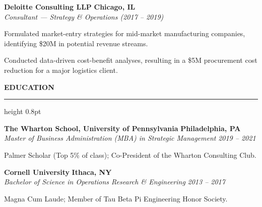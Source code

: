 \documentclass[10pt,letterpaper]{article}
\newcommand{\cvsection}[1]{%
  \vspace{9pt}%
  {\large\bfseries\color{accent}\MakeUppercase{#1}}%
  \vspace{3pt}%
  {\color{bordergray}\hrule height 0.8pt}%
  \vspace{5pt}%
}
\begin{document}
\vspace{5pt}
\textbf{Deloitte Consulting LLP} \hfill \textbf{Chicago, IL} \\
\textit{Consultant --- Strategy \& Operations (2017 -- 2019)}
\begin{cvitemize}
  \item Formulated market-entry strategies for mid-market manufacturing companies, identifying \$20M in potential revenue streams.
  \item Conducted data-driven cost-benefit analyses, resulting in a \$5M procurement cost reduction for a major logistics client.
\end{cvitemize}

\cvsection{Education}

\textbf{The Wharton School, University of Pennsylvania} \hfill \textbf{Philadelphia, PA} \\
\textit{Master of Business Administration (MBA) in Strategic Management} \hfill \textit{2019 -- 2021}
\begin{cvitemize}
  \item Palmer Scholar (Top 5\% of class); Co-President of the Wharton Consulting Club.
\end{cvitemize}

\vspace{5pt}
\textbf{Cornell University} \hfill \textbf{Ithaca, NY} \\
\textit{Bachelor of Science in Operations Research \& Engineering} \hfill \textit{2013 -- 2017}
\begin{cvitemize}
  \item Magna Cum Laude; Member of Tau Beta Pi Engineering Honor Society.
\end{cvitemize}
\end{document}
